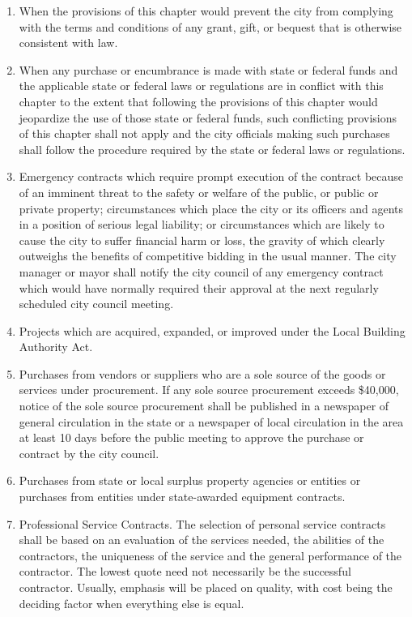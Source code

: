 \begin{enumerate}
	\item When the provisions of this chapter would prevent the city from complying with the terms and conditions of any grant, gift, or bequest that is otherwise consistent with law.
	\item When any purchase or encumbrance is made with state or federal funds and the applicable state or federal laws or regulations are in conflict with this chapter to the extent that following the provisions of this chapter would jeopardize the use of those state or federal funds, such conflicting provisions of this chapter shall not apply and the city officials making such purchases shall follow the procedure required by the state or federal laws or regulations.
	\item Emergency contracts which require prompt execution of the contract because of an imminent threat to the safety or welfare of the public, or public or private property; circumstances which place the city or its officers and agents in a position of serious legal liability; or circumstances which are likely to cause the city to suffer financial harm or loss, the gravity of which clearly outweighs the benefits of competitive bidding in the usual manner. The city manager or mayor shall notify the city council of any emergency contract which would have normally required their approval at the next regularly scheduled city council meeting.
	\item Projects which are acquired, expanded, or improved under the Local Building Authority Act.
	\item Purchases from vendors or suppliers who are a sole source of the goods or services under procurement. If any sole source procurement exceeds \$40,000, notice of the sole source procurement shall be published in a newspaper of general circulation in the state or a newspaper of local circulation in the area at least 10 days before the public meeting to approve the purchase or contract by the city council.
	\item Purchases from state or local surplus property agencies or entities or purchases from entities under state-awarded equipment contracts. 
	\item Professional Service Contracts. The selection of personal service contracts shall be based on an evaluation of the services needed, the abilities of the contractors, the uniqueness of the service and the general performance of the contractor. The lowest quote need not necessarily be the successful contractor. Usually, emphasis will be placed on quality, with cost being the deciding factor when everything else is equal.
\end{enumerate}

